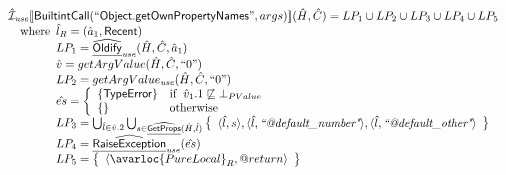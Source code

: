 \[\begin{array}{l}
\aI_{\it use}\lbr \SF{BuiltintCall}(``\SF{Object.getOwnPropertyNames}",args)\rbr(\hat{H},\hat{C}) = LP_1 \cup LP_2 \cup LP_3 \cup LP_4 \cup LP_5\\
\quad\wherec{
  \hat{l}_R = (\hat{a}_1, \SF{Recent})\\
  LP_1 = \ahf{Oldify}_{\it use}(\hat{H}, \hat{C}, \hat{a}_1)\\
  \hat{v} = getArgValue(\hat{H}, \hat{C}, ``0")\\
  LP_2 = getArgValue_{\it use}(\hat{H}, \hat{C}, ``0")\\
  \hat{es} = \left\{\begin{array}{ll}
      \{ \SF{TypeError} \}
      & \ifc{\hat{v}_1.1 \not\sqsubseteq \bot_{PValue}}\\
      \set{} & \owc
    \end{array}\right.\\
  LP_3 = \bigcup_{\hat{l} \in \hat{v}.2} \bigcup_{s \in \ahf{GetProps}(\hat{H}, \hat{l})}  \set{\langle \hat{l}, s\rangle, \langle \hat{l}, \emph{``@default\_number"}\rangle, \langle \hat{l}, \emph{``@default\_other"}\rangle}\\ 
  LP_4 = \ahf{RaiseException}_{\it use}(\hat{es})\\ 
  LP_5 = \set{\langle\avarloc{PureLocal}_R,\varprop{return}\rangle}\\
  }\\
\\





\end{array}\]
